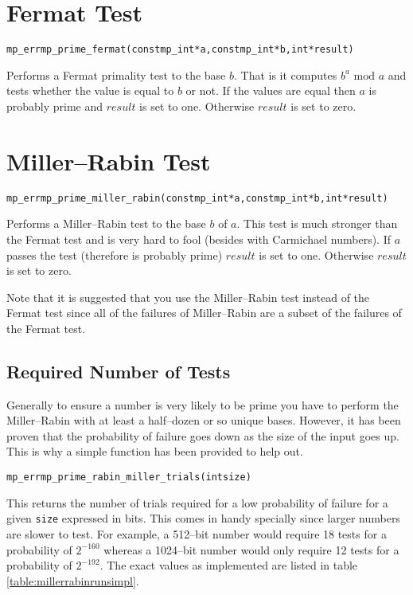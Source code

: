 \documentclass[synpaper]{book}
\begin{document}
\section{Fermat Test}
\begin{alltt}
mp_err mp_prime_fermat (const mp_int *a, const mp_int *b, int *result)
\end{alltt}
Performs a Fermat primality test to the base $b$.  That is it computes $b^a \mbox{ mod }a$ and
tests whether the value is equal to $b$ or not.  If the values are equal then $a$ is probably prime
and $result$ is set to one. Otherwise $result$ is set to zero.

\section{Miller--Rabin Test}
\begin{alltt}
mp_err mp_prime_miller_rabin (const mp_int *a, const mp_int *b, int *result)
\end{alltt}
Performs a Miller--Rabin test to the base $b$ of $a$.  This test is much stronger than the Fermat
test and is very hard to fool (besides with Carmichael numbers).  If $a$ passes the test (therefore
is probably prime) $result$ is set to one. Otherwise $result$ is set to zero.

Note that it is suggested that you use the Miller--Rabin test instead of the Fermat test since all
of the failures of Miller--Rabin are a subset of the failures of the Fermat test.

\subsection{Required Number of Tests}
Generally to ensure a number is very likely to be prime you have to perform the Miller--Rabin with
at least a half--dozen or so unique bases.  However, it has been proven that the probability of
failure goes down as the size of the input goes up. This is why a simple function has been provided
to help out.

\begin{alltt}
mp_err mp_prime_rabin_miller_trials(int size)
\end{alltt}
This returns the number of trials required for a low probability of failure for a given
\texttt{size} expressed in bits.  This comes in handy specially since larger numbers are slower to
test. For example, a 512--bit number would require 18 tests for a probability of $2^{-160}$ whereas
a 1024--bit number would only require 12 tests for a probability of $2^{-192}$. The exact values as
implemented are listed in table \ref{table:millerrabinrunsimpl}.
\end{document}
